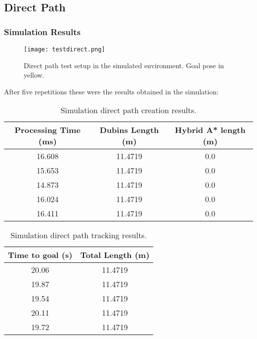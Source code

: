 \subsection{Direct Path}
\label{subsec:direct_path}
\subsubsection{Simulation Results}

\begin{figure}[h]
    \centering
    \texttt{[image: testdirect.png]}
    \caption{Direct path test setup in the simulated environment. Goal pose in yellow.}
    \label{fig:direct_path}
\end{figure}
After five repetitions these were the results obtained in the simulation:

\begin{table}[H]
    \centering
    \begin{tabular}{|c|c|c|}
        \hline
        \textbf{Processing Time (ms)} & \textbf{Dubins Length (m)} & \textbf{Hybrid A* length (m)} \\
        \hline
         16.608 & 11.4719 & 0.0  \\
        \hline
         15.653 & 11.4719 & 0.0 \\
         \hline
         14.873 & 11.4719 & 0.0 \\
         \hline
         16.024 & 11.4719 & 0.0 \\
         \hline
         16.411 & 11.4719 & 0.0 \\
         \hline
    \end{tabular}
    \caption{Simulation direct path creation results.}
    \label{tab:direct_path_results1}
\end{table}
\begin{table}[H]
    \centering
    \begin{tabular}{|c|c|}
        \hline
        \textbf{Time to goal (s)} & \textbf{Total Length (m)} \\
        \hline
        20.06 & 11.4719 \\
        \hline
        19.87 & 11.4719 \\
         \hline
         19.54 & 11.4719 \\
         \hline
         20.11 & 11.4719 \\
         \hline
         19.72 & 11.4719 \\
         \hline
    \end{tabular}
    \caption{Simulation direct path tracking results.}
    \label{tab:direct_path_results2}
\end{table}

